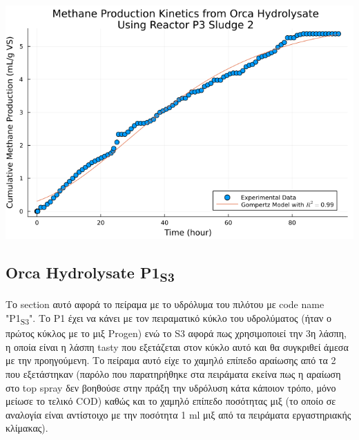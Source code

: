 \documentclass[11pt]{article}
\begin{document}
\begin{center}
\includegraphics[width=.9\linewidth]{../plots/BMPs/Orca Hydrolysate/specific_methane_kinetics_orca_p3_s2_hour.png}
\end{center}

\subsection{Orca Hydrolysate P1\textsubscript{S3}}
\label{sec:orgdf14137}
Το section αυτό αφορά το πείραμα με το υδρόλυμα του πιλότου με code name "P1\textsubscript{S3}". Το P1 έχει να κάνει με τον πειραματικό κύκλο του υδρολύματος (ήταν ο πρώτος κύκλος με το μιξ Progen) ενώ το S3 αφορά πως χρησιμοποιεί την 3η λάσπη, η οποία είναι η λάσπη tasty που εξετάζεται στον κύκλο αυτό και θα συγκριθεί άμεσα με την προηγούμενη. Το πείραμα αυτό είχε το χαμηλό επίπεδο αραίωσης από τα 2 που εξετάστηκαν (παρόλο που παρατηρήθηκε στα πειράματα εκείνα πως η αραίωση στο top spray δεν βοηθούσε στην πράξη την υδρόλυση κάτα κάποιον τρόπο, μόνο μείωσε το τελικό COD) καθώς και το χαμηλό επίπεδο ποσότητας μιξ (το οποίο σε αναλογία είναι αντίστοιχο με την ποσότητα 1 ml μιξ από τα πειράματα εργαστηριακής κλίμακας). 
\end{document}
